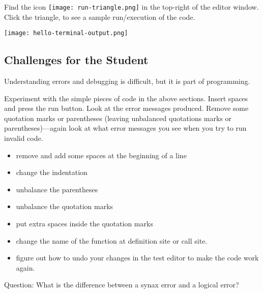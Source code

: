 Find the icon \texttt{[image: run-triangle.png]}
  in the top-right of the editor window.  Click the triangle, to see a sample run/execution of the code.

\noindent\texttt{[image: hello-terminal-output.png]}


\subsection{Challenges for the Student}

Understanding errors and debugging is difficult, but it is part of programming.

Experiment with the simple pieces of code in the above sections.
Insert spaces and press the run button.  Look at the error messages
produced. Remove some quotation marks or parentheses (leaving
unbalanced quotations marks or parentheses)---again look at what error
messages you see when you try to run invalid code.


\begin{itemize}
\item remove and add some spaces at the beginning of a line
\item change the indentation
\item unbalance the parentheses
\item unbalance the quotation marks
\item put extra spaces inside the quotation marks
\item change the name of the  function at definition site or call site.
\item figure out how to undo your changes in the test editor to make the code work again.
\end{itemize}

Question:  What is the difference between a synax error and a logical error?
\clearpage

